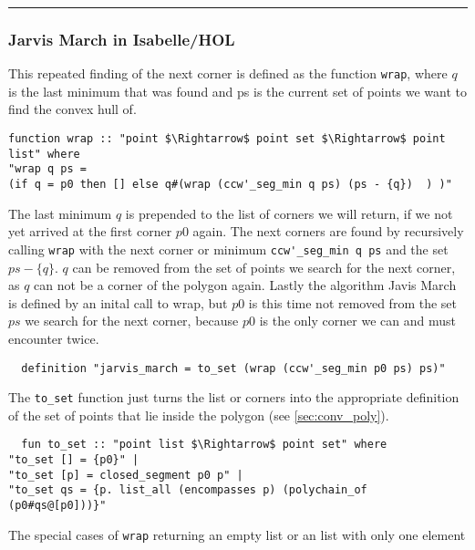\begin{minipage}[t]{0.33\textwidth}
  \centering
       
\end{minipage}
\hfill
\rule{0.5pt}{\textheight}
\hfill
\begin{minipage}[t]{0.33\textwidth}
\centering
\end{minipage}
\vspace{0.5cm}


\subsubsection{Jarvis March in Isabelle/HOL}
This repeated finding of the next corner is defined as the function \lstinline|wrap|, where
$q$ is the last minimum that was found and ps is the current set of points we want to find
the convex hull of.
\begin{lstlisting}
function wrap :: "point $\Rightarrow$ point set $\Rightarrow$ point list" where
"wrap q ps =  
(if q = p0 then [] else q#(wrap (ccw'_seg_min q ps) (ps - {q})  ) )"
\end{lstlisting}
The last minimum $q$ is prepended to the list of corners we will return, if we not yet arrived
at the first corner $p0$ again. The next corners are found by  recursively calling \lstinline|wrap|
with the next corner or minimum \lstinline|ccw'_seg_min q ps| and the set $ps - \{q\}$. $q$ can be
removed from the set of points we search for the next corner, as $q$ can not be a corner
of the polygon again.
Lastly the algorithm Javis March is defined by an inital call to wrap, but $p0$ is this time
not removed from the set $ps$ we search for the next corner, because $p0$ is the only corner we
can and must encounter twice.
\begin{lstlisting}
  definition "jarvis_march = to_set (wrap (ccw'_seg_min p0 ps) ps)"
\end{lstlisting}  
The \lstinline|to_set| function just turns the list or corners into the appropriate 
definition of the set of points that lie inside the polygon (see \ref{sec:conv_poly}).  
\begin{lstlisting}
  fun to_set :: "point list $\Rightarrow$ point set" where
"to_set [] = {p0}" |
"to_set [p] = closed_segment p0 p" |
"to_set qs = {p. list_all (encompasses p) (polychain_of (p0#qs@[p0]))}" 
\end{lstlisting}
The special cases of \lstinline|wrap| returning an empty list or an list with only one element
